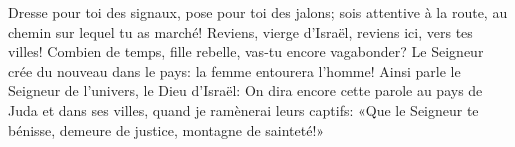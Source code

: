 Dresse pour toi des signaux, pose pour toi des jalons;
	sois attentive à la route, au chemin sur lequel tu as marché!
	Reviens, vierge d’Israël, reviens ici, vers tes villes!
Combien de temps, fille rebelle, vas-tu encore vagabonder?
Le Seigneur crée du nouveau dans le pays:
	la femme entourera l’homme!
Ainsi parle le Seigneur de l’univers, le Dieu d’Israël:
	On dira encore cette parole au pays de Juda et dans ses villes,
	quand je ramènerai leurs captifs:
	«Que le Seigneur te bénisse, demeure de justice, montagne de sainteté!»

